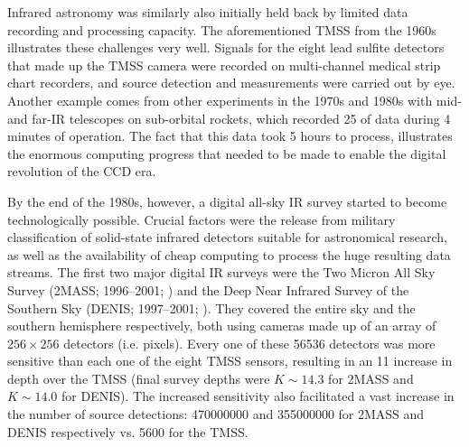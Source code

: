 Infrared astronomy was similarly also initially held back by limited data recording and processing capacity. The aforementioned TMSS from the 1960s illustrates these challenges very well. Signals for the eight lead sulfite detectors that made up the TMSS camera were recorded on multi-channel medical strip chart recorders, and source detection and measurements were carried out by eye. Another example comes from other experiments in the 1970s and 1980s with mid- and far-IR telescopes on sub-orbital rockets, which recorded \SI{25}{\MB} of data during 4 minutes of operation. The fact that this data took 5 hours to process, illustrates the enormous computing progress that needed to be made to enable the digital revolution of the CCD era. \par

By the end of the 1980s, however, a digital all-sky IR survey started to become technologically possible. Crucial factors were the release from military classification of solid-state infrared detectors suitable for astronomical research, as well as the availability of cheap computing to process the huge resulting data streams. The first two major digital IR surveys were the Two Micron All Sky Survey (2MASS; 1996--2001; \citealt{2006AJ....131.1163S}) and the Deep Near Infrared Survey of the Southern Sky (DENIS; 1997--2001; \citealt{1997Msngr..87...27E}). They covered the entire sky and the southern hemisphere respectively, both using cameras made up of an array of $256 \times 256$ detectors (i.e. pixels). Every one of these \num{56536} detectors was more sensitive than each one of the eight TMSS sensors, resulting in an \SI{11}{\mag} increase in depth over the TMSS (final survey depths were $K\sim 14.3$ for 2MASS and $K\sim14.0$ for DENIS). The increased sensitivity also facilitated a vast increase in the number of source detections: \num{470 000 000} and \num{355 000 000} for 2MASS and DENIS respectively vs. 5600 for the TMSS. \par

